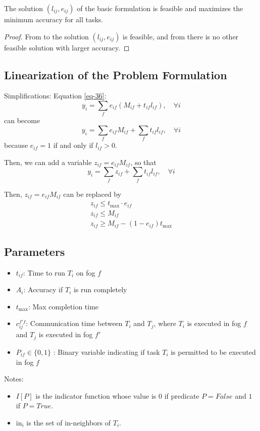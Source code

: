 \begin{theorem}
The solution $(l_{ij}, e_{ij})$ of the basic formulation is feasible and maximizes the minimum accuracy for all tasks.
\end{theorem}
\begin{proof}
From  to  the solution $(l_{ij}, e_{ij})$ is feasible, and from  there is no other feasible solution with larger accuracy.
\end{proof}

\subsection{Linearization of the Problem Formulation}

Simplifications: 
Equation \ref{eq-36}:
$$
y_i = \sum_f e_{if} \left( M_{if} + t_{if} l_{if} \right) , \quad \forall i
$$ 
can become 
$$
y_i = \sum_f e_{if} M_{if} + \sum_f t_{if} l_{if} , \quad \forall i
$$ 
because $e_{if}=1$ if and only if $l_{if}>0$.

Then, we can add a variable $z_{if}=e_{if} M_{if}$, so that
$$
y_i = \sum_f z_{if} + \sum_f t_{if} l_{if} , \quad \forall i
$$ 

Then, $z_{if}=e_{if} M_{if}$ can be replaced by
\begin{align}
    z_{if} \leq t_{\max} \cdot e_{if} \\
    z_{if} \leq M_{if} \\
    z_{if} \geq M_{if} - (1 - e_{if}) t_{\max}
\end{align}

\subsection{Parameters}
\begin{itemize}
    \item $t_{if}$: Time to run $T_i$ on fog $f$
    \item $A_i$: Accuracy if $T_i$ is run completely
    \item $t_{\max}$: Max completion time
    \item $c_{ij}^{f'f}$: Communication time between $T_i$ and $T_j$, where $T_i$ is executed in fog $f$ and $T_j$ is executed in fog $f'$
    \item $P_{if} \in \{0,1\}$ : Binary variable indicating if task $T_i$ is permitted to be executed in fog $f$
\end{itemize}
Notes: 
\begin{itemize}
    \item $I[P]$ is the indicator function whose value is $0$ if predicate $P=False$ and $1$ if $P=True$.
    \item $\text{in}_i$ is the set of in-neighbors of $T_i$.
\end{itemize}

